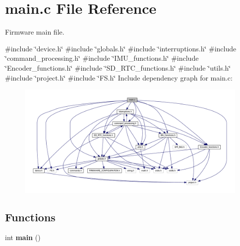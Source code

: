 \section{main.\+c File Reference}
\label{main_8c}


Firmware main file.  


{\ttfamily \#include \char`\"{}device.\+h\char`\"{}}\newline
{\ttfamily \#include \char`\"{}globals.\+h\char`\"{}}\newline
{\ttfamily \#include \char`\"{}interruptions.\+h\char`\"{}}\newline
{\ttfamily \#include \char`\"{}command\+\_\+processing.\+h\char`\"{}}\newline
{\ttfamily \#include \char`\"{}I\+M\+U\+\_\+functions.\+h\char`\"{}}\newline
{\ttfamily \#include \char`\"{}Encoder\+\_\+functions.\+h\char`\"{}}\newline
{\ttfamily \#include \char`\"{}S\+D\+\_\+\+R\+T\+C\+\_\+functions.\+h\char`\"{}}\newline
{\ttfamily \#include \char`\"{}utils.\+h\char`\"{}}\newline
{\ttfamily \#include \char`\"{}project.\+h\char`\"{}}\newline
{\ttfamily \#include \char`\"{}F\+S.\+h\char`\"{}}\newline
Include dependency graph for main.\+c\+:\nopagebreak
\begin{figure}[H]
\begin{center}
\leavevmode
\includegraphics[width=350pt]{main_8c__incl}
\end{center}
\end{figure}
\subsection*{Functions}
\begin{DoxyCompactItemize}
\item 
\mbox{\label{main_8c_ae66f6b31b5ad750f1fe042a706a4e3d4}} 
int {\bfseries main} ()
\end{DoxyCompactItemize}


